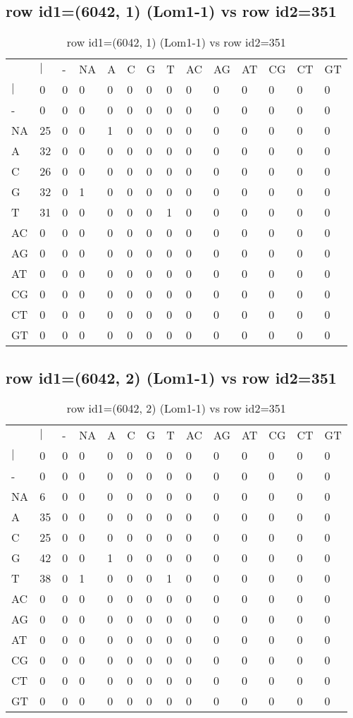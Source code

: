 \subsection{row id1=(6042, 1) (Lom1-1) vs row id2=351}
\begin{center}
\begin{longtable}{|l|l|l|l|l|l|l|l|l|l|l|l|l|l|}
\caption{row id1=(6042, 1) (Lom1-1) vs row id2=351} \label{table_dm30}\\
\hline
\\
\hline
&$|$&-&NA&A&C&G&T&AC&AG&AT&CG&CT&GT\\
$|$&0&0&0&0&0&0&0&0&0&0&0&0&0\\
-&0&0&0&0&0&0&0&0&0&0&0&0&0\\
NA&25&0&0&1&0&0&0&0&0&0&0&0&0\\
A&32&0&0&0&0&0&0&0&0&0&0&0&0\\
C&26&0&0&0&0&0&0&0&0&0&0&0&0\\
G&32&0&1&0&0&0&0&0&0&0&0&0&0\\
T&31&0&0&0&0&0&1&0&0&0&0&0&0\\
AC&0&0&0&0&0&0&0&0&0&0&0&0&0\\
AG&0&0&0&0&0&0&0&0&0&0&0&0&0\\
AT&0&0&0&0&0&0&0&0&0&0&0&0&0\\
CG&0&0&0&0&0&0&0&0&0&0&0&0&0\\
CT&0&0&0&0&0&0&0&0&0&0&0&0&0\\
GT&0&0&0&0&0&0&0&0&0&0&0&0&0\\
\hline
\end{longtable}
\end{center}

\subsection{row id1=(6042, 2) (Lom1-1) vs row id2=351}
\begin{center}
\begin{longtable}{|l|l|l|l|l|l|l|l|l|l|l|l|l|l|}
\caption{row id1=(6042, 2) (Lom1-1) vs row id2=351} \label{table_dm32}\\
\hline
\\
\hline
&$|$&-&NA&A&C&G&T&AC&AG&AT&CG&CT&GT\\
$|$&0&0&0&0&0&0&0&0&0&0&0&0&0\\
-&0&0&0&0&0&0&0&0&0&0&0&0&0\\
NA&6&0&0&0&0&0&0&0&0&0&0&0&0\\
A&35&0&0&0&0&0&0&0&0&0&0&0&0\\
C&25&0&0&0&0&0&0&0&0&0&0&0&0\\
G&42&0&0&1&0&0&0&0&0&0&0&0&0\\
T&38&0&1&0&0&0&1&0&0&0&0&0&0\\
AC&0&0&0&0&0&0&0&0&0&0&0&0&0\\
AG&0&0&0&0&0&0&0&0&0&0&0&0&0\\
AT&0&0&0&0&0&0&0&0&0&0&0&0&0\\
CG&0&0&0&0&0&0&0&0&0&0&0&0&0\\
CT&0&0&0&0&0&0&0&0&0&0&0&0&0\\
GT&0&0&0&0&0&0&0&0&0&0&0&0&0\\
\hline
\end{longtable}
\end{center}

